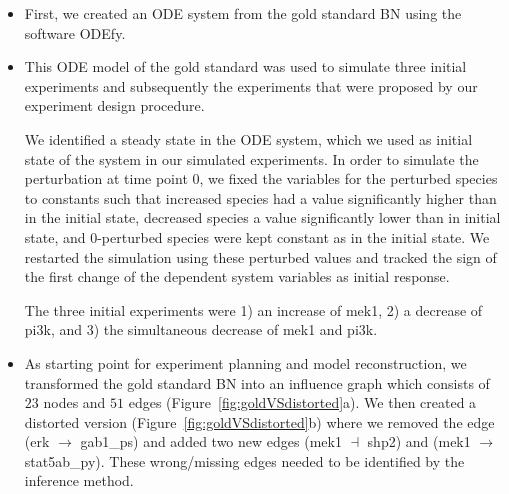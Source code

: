 \begin{itemize}
  \item First, we created an ODE system from the gold standard BN using the software ODEfy\cite{odefy}.
  \item This ODE model of the gold standard was used to simulate three initial experiments and subsequently
the experiments that were proposed by our experiment design procedure.

We identified a steady state in the ODE system,
which we used as initial state of the system in our simulated experiments.
In order to simulate the perturbation at time point 0,
we fixed the variables for the perturbed species to constants such that
increased species had a value significantly higher than in the initial state,
decreased species a value %
significantly lower than in initial state, and
0-perturbed species were kept constant as in the initial state.
We restarted the simulation using these perturbed values and tracked the sign
of the first change of the dependent system variables as initial response.

The three initial experiments were
1) an increase of {\sffamily mek1},
2) a decrease of {\sffamily pi3k}, and
3) the simultaneous decrease of {\sffamily mek1} and {\sffamily pi3k}.

  \item As starting point for experiment planning and model reconstruction,
we transformed the gold standard BN into an influence graph which consists of
 $23$ nodes and $51$ edges (Figure~\ref{fig:goldVSdistorted}a).
We then created a distorted version (Figure~\ref{fig:goldVSdistorted}b) where
we removed the edge ({\sffamily erk} $\rightarrow$ {\sffamily gab1\_ps}) and added two new edges
 ({\sffamily mek1} $\dashv$ {\sffamily shp2}) and
 ({\sffamily mek1} $\rightarrow$ {\sffamily stat5ab\_py}).
These wrong/missing edges needed to be identified by the inference method.





\end{itemize}
